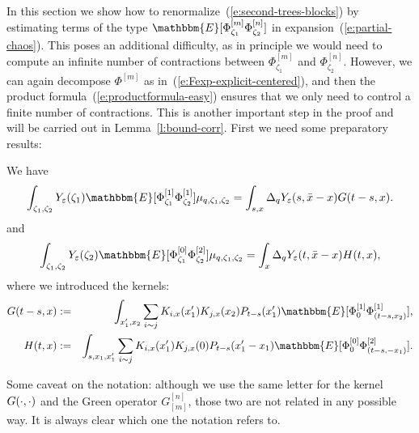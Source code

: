 In this section we show how to renormalize~(\ref{e:second-trees-blocks}) by
estimating terms of the type $\mathbbm{E} [\Phi^{[m]}_{\zeta_1}
\Phi^{[n]}_{\zeta_2}]$ in expansion~(\ref{e:partial-chaos}). This poses an
additional difficulty, as in principle we would need to compute an infinite
number of contractions between $\Phi^{[m]}_{\zeta_1}$ and
$\Phi^{[n]}_{\zeta_2}$. However, we can again decompose $\Phi^{[m]}$ as
in~(\ref{e:Fexp-explicit-centered}), and then the product
formula~(\ref{e:productformula-easy}) ensures that we only need to control a
finite number of contractions. This is another important step in the proof and
will be carried out in Lemma~\ref{l:bound-corr}. First we need some
preparatory results:

\begin{lemma}
  We have
  \[ \int_{\zeta_1, \zeta_2} Y_{\varepsilon} (\zeta_1) \mathbbm{E}
     [\Phi^{[1]}_{\zeta_1} \Phi^{[1]}_{\zeta_2}] \mu_{q, \zeta_1, \zeta_2} =
     \int_{s, x} \Delta_q Y_{\varepsilon} (s, \bar{x} - x) G (t - s, x) . \]
  and
  \[ \int_{\zeta_1, \zeta_2} Y_{\varepsilon} (\zeta_2) \mathbbm{E}
     [\Phi^{[0]}_{\zeta_1} \Phi^{[2]}_{\zeta_2}] \mu_{q, \zeta_1, \zeta_2} =
     \int_x \Delta_q Y_{\varepsilon} (t, \bar{x} - x) H (t, x), \]
  where we introduced the kernels:
  \begin{eqnarray*}
    G (t - s, x) & \assign & \int_{x_1', x_2}  \sum_{i \sim j} K_{i, x} (x_1')
    K_{j, x} (x_2) P_{t - s} (x_1') \mathbbm{E} [\Phi^{[1]}_0 \Phi^{[1]}_{(t -
    s, x_2)}],\\
    H (t, x) & \assign & \int_{s, x_1, x_1'}  \sum_{i \sim j} K_{i, x} (x_1')
    K_{j, x} (0) P_{t - s} (x_1' - x_1) \mathbbm{E} [\Phi^{[0]}_0
    \Phi^{[2]}_{(t - s, - x_1)}] .
  \end{eqnarray*}
\end{lemma}

\begin{remark}
  Some caveat on the notation: although we use the same letter for the kernel
  $G (\cdot, \cdot)$ and the Green operator $G_{[m]}^{[n]}$, those two are
  not related in any possible way. It is always clear which one the notation
  refers to.
\end{remark}

